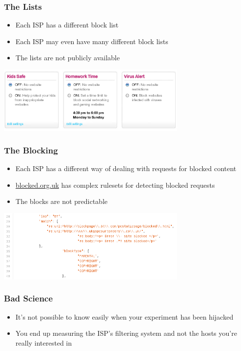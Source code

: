 \documentclass{beamer}
\begin{document}
\begin{frame}
	\frametitle{The Lists}
	\begin{itemize}
		\item{Each ISP has a different block list}
		\item{Each ISP may even have many different block lists}
		\item{The lists are not publicly available}
	\end{itemize}
	\begin{center}
		\includegraphics[width=0.7\textwidth]{talktalk.png}
	\end{center}
\end{frame}

\begin{frame}
	\frametitle{The Blocking}
	\begin{itemize}
		\item{Each ISP has a different way of dealing with requests for blocked content}
		\item{\url{blocked.org.uk} has complex rulesets for detecting blocked requests}
		\item{The blocks are not predictable}
	\end{itemize}
	\begin{center}
		\includegraphics[width=0.7\textwidth]{blockedrules.png}
	\end{center}
\end{frame}

\begin{frame}
	\frametitle{Bad Science}
	\begin{itemize}
		\item{It's not possible to know easily when your experiment has
			been hijacked}
		\item{You end up measuring the ISP's filtering system and not
			the hosts you're really interested in}
	\end{itemize}
\end{frame}
\end{document}
